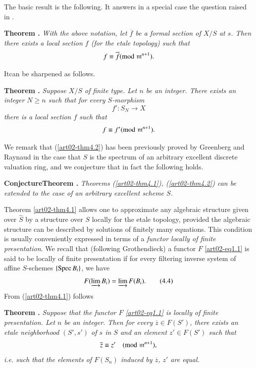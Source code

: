 The basic result is the following. It answers in a special case the question raised in \cite{art02-key3}.

\medskip
\noindent
{\bf Theorem .\label{art02-thm4.1}}
{\em With the above notation, let $\overline{f}$ be a formal section of $X/S$ at $s$. Then there exists a local section $f$ (for the etale topology) such that}
$$
f\equiv \overline{f}({\rm{mod}}\kern.3em \mathfrak{m}^{n+1}).
$$
\smallskip

It\pageoriginale can be sharpened as follows.

\medskip
\noindent
{\bf Theorem .\label{art02-thm4.2}}
{\em Suppose $X/S$ of finite type. Let $n$ be an integer. There exists an integer $N\geq n$ such that for every $S$-morphism}
$$
f':S_{N}\to X
$$
{\em there is a local section $f$ such that}
$$
f\equiv f'({\rm{mod}}\kern.3em \mathfrak{m}^{n+1}).
$$
\smallskip

We remark that (\ref{art02-thm4.2}) has been previously proved by Greenberg \cite{art02-key10} and Raynaud in the case that $S$ is the spectrum of an arbitrary excellent discrete valuation ring, and we conjecture that in fact the following holds.

\medskip
\noindent
{\bf ConjectureTheorem .\label{art02-conj4.3}}
{\em Theorems (\ref{art02-thm4.1}), (\ref{art02-thm4.2}) can be extended to the case of an arbitrary excellent scheme $S$.}
\smallskip

Theorem \ref{art02-thm4.1} allows one to approximate any algebraic structure given over $\widehat{S}$ by a structure over $S$ locally for the etale topology, provided the algebraic structure can be described by solutions of finitely many equations. This condition is usually conveniently expressed in terms of a {\em functor locally of finite presentation}. We recall that (following Grothendieck) a functor $F$ \eqref{art02-eq1.1} is said to be locally of finite presentation if for every filtering inverse system of affine $S$-schemes $\{\operatorname{Spec} B_{i}\}$, we have
\begin{equation*}
F(\varinjlim B_{i})=\varinjlim F(B_{i}).\tag{4.4}\label{art02-eq4.4}
\end{equation*}
From (\ref{art02-thm4.1}) follows

\medskip
\noindent
{\bf Theorem .\label{art02-thm4.5}}
{\em Suppose that the functor $F$ \eqref{art02-eq1.1} is locally of finite presentation. Let $n$ be an integer. Then for every $\overline{z}\in F(S')$, there exists an etale neighborhood $(S',s')$ of $s$ in $S$ and an element $z'\in F(S')$ such that}
$$
\overline{z}\equiv z'\quad ({\rm{mod}}\kern.3em \mathfrak{m}^{n+1}),
$$
{\em i.e. such that the elements of $F(S_{n})$ induced by $\overline{z}$, $z'$ are equal.}
\medskip

